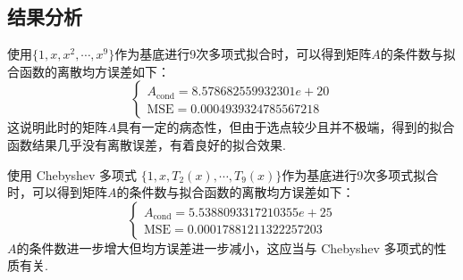 \documentclass[UTF8,ctexart,a4paper,11pt,openany]{article}
\theoremstyle{definition}
\begin{document}
    \subsection{结果分析}
        使用$\{1,x,x^2,\cdots,x^9\}$作为基底进行9次多项式拟合时，可以得到矩阵$A$的条件数与拟合函数的离散均方误差如下：$$\left\{\begin{array}{l}
            A_{\text{cond}}=8.578682559932301e+20 \\
            \text{MSE}=0.0004939324785567218
            \end{array}\right.$$
        这说明此时的矩阵$A$具有一定的病态性，但由于选点较少且并不极端，得到的拟合函数结果几乎没有离散误差，有着良好的拟合效果. \par 使用 Chebyshev 多项式 $\{1,x,T_2(x),\cdots,T_9(x)\}$作为基底进行9次多项式拟合时，可以得到矩阵$A$的条件数与拟合函数的离散均方误差如下：$$\left\{\begin{array}{l}
            A_{\text{cond}}=5.5388093317210355e+25 \\
            \text{MSE}=0.00017881211322257203
            \end{array}\right.$$
        $A$的条件数进一步增大但均方误差进一步减小，这应当与 Chebyshev 多项式的性质有关. 
\end{document}
